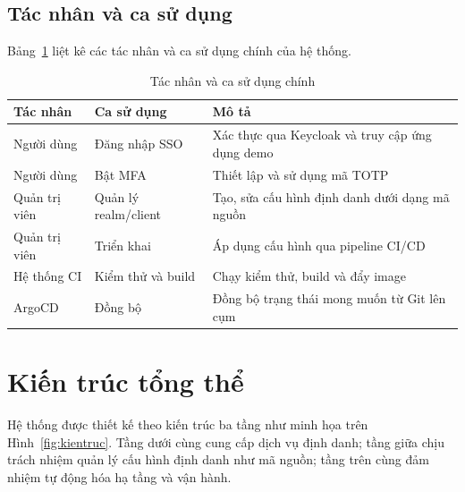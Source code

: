 \subsection{Tác nhân và ca sử dụng}
\label{subsec:usecase}

Bảng~\ref{tab:usecase} liệt kê các tác nhân và ca sử dụng chính của hệ thống.

\begin{table}[htbp]
\centering
\caption{Tác nhân và ca sử dụng chính}
\label{tab:usecase}
\small
\begin{tabular}{p{2.6cm} p{4.2cm} p{6.4cm}}
\toprule
\textbf{Tác nhân} & \textbf{Ca sử dụng} & \textbf{Mô tả}\\
\midrule
Người dùng & Đăng nhập SSO & Xác thực qua Keycloak và truy cập ứng dụng demo\\
Người dùng & Bật MFA & Thiết lập và sử dụng mã TOTP\\
Quản trị viên & Quản lý realm/client & Tạo, sửa cấu hình định danh dưới dạng mã nguồn\\
Quản trị viên & Triển khai & Áp dụng cấu hình qua pipeline CI/CD\\
Hệ thống CI & Kiểm thử và build & Chạy kiểm thử, build và đẩy image\\
ArgoCD & Đồng bộ & Đồng bộ trạng thái mong muốn từ Git lên cụm\\
\bottomrule
\end{tabular}
\end{table}

\section{Kiến trúc tổng thể}
\label{sec:kientruc}

Hệ thống được thiết kế theo kiến trúc ba tầng như minh họa trên
Hình~\ref{fig:kientruc}. Tầng dưới cùng cung cấp dịch vụ định danh;
tầng giữa chịu trách nhiệm quản lý cấu hình định danh như mã nguồn;
tầng trên cùng đảm nhiệm tự động hóa hạ tầng và vận hành.

